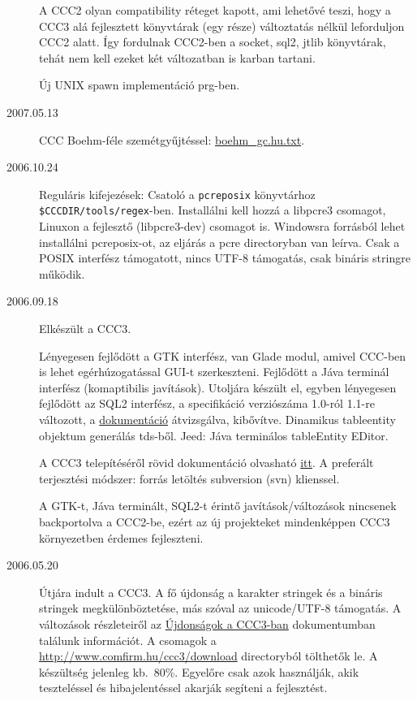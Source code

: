 \begin{description}
  A CCC2 olyan compatibility réteget kapott, ami lehetővé teszi,
  hogy a CCC3 alá fejlesztett könyvtárak (egy része) változtatás
  nélkül leforduljon CCC2 alatt. Így fordulnak CCC2-ben 
  a socket, sql2, jtlib  könyvtárak, 
  tehát nem kell ezeket két változatban is karban tartani.

  Új UNIX spawn implementáció prg-ben.

\label{20070513}
\item[2007.05.13]
  CCC Boehm-féle szemétgyűjtéssel:  \href{boehm_gc.hu.txt}{boehm\_gc.hu.txt}.

\label{20061024}
\item[2006.10.24]
  Reguláris kifejezések: Csatoló a \verb!pcreposix! 
  könyvtárhoz \verb!$CCCDIR/tools/regex!-ben.
  Installálni kell hozzá a libpcre3 csomagot,
  Linuxon a fejlesztő (libpcre3-dev) csomagot is.
  Windowsra forrásból lehet installálni pcreposix-ot,
  az eljárás a pcre directoryban van leírva.
  Csak a POSIX interfész támogatott,
  nincs UTF-8 támogatás, 
  csak bináris stringre működik.

\label{20060918}
\item[2006.09.18]
  Elkészült a CCC3. 

  Lényegesen fejlődött a GTK interfész, van Glade modul,
  amivel CCC-ben is lehet egérhúzogatással GUI-t szerkeszteni.
  Fejlődött a Jáva terminál interfész (komaptibilis javítások).
  Utoljára készült el, egyben lényegesen fejlődött az SQL2 interfész,
  a specifikáció verziószáma 1.0-ról 1.1-re változott,   a 
  \href{sql2.html}{dokumentáció} átvizsgálva, kibővítve.
  Dinamikus tableentity objektum generálás tds-ből.
  Jeed: Jáva terminálos tableEntity EDitor.
  
  A CCC3 telepítéséről rövid dokumentáció olvasható 
  \href{http://ccc.comfirm.hu./ccc3/download/olvass.html}{itt}.
  A preferált terjesztési módszer: forrás letöltés subversion 
  (svn) klienssel.
  
  A GTK-t, Jáva terminált, SQL2-t érintő javítások/változások
  nincsenek backportolva a CCC2-be, ezért az új projekteket 
  mindenképpen CCC3 környezetben érdemes fejleszteni.

\label{20060520}
\item[2006.05.20]
  Útjára indult a CCC3.
  A fő újdonság a karakter stringek 
  és a bináris stringek megkülönböztetése,
  más szóval az unicode/UTF-8 támogatás.
  A változások részleteiről az
  \href{ccc3_ujdonsagok.html}{Újdonságok a CCC3-ban}
  dokumentumban találunk információt.
  A csomagok a 
  \href{http://www.comfirm.hu/ccc3/download}{http://www.comfirm.hu/ccc3/download}
  directoryból tölthetők le. A készültség jelenleg kb.~80\%.
  Egyelőre csak azok használják, akik teszteléssel és hibajelentéssel
  akarják segíteni a fejlesztést.



\end{description}
